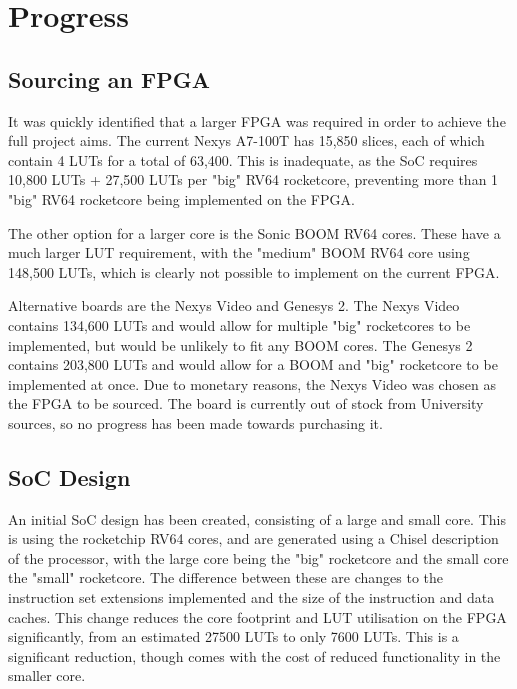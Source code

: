 \section{Progress}
\label{sec:progress}
\subsection{Sourcing an FPGA}
It was quickly identified that a larger FPGA was required in order to achieve the full project aims. The current Nexys A7-100T\cite{nexys-a7-100t} has 15,850 slices, each of which contain 4 LUTs for a total of 63,400. This is inadequate, as the SoC requires 10,800 LUTs + 27,500 LUTs per "big" RV64 rocketcore, preventing more than 1 "big" RV64 rocketcore being implemented on the FPGA.

The other option for a larger core is the Sonic BOOM RV64 cores. These have a much larger LUT requirement, with the "medium" BOOM\cite{boom-core} RV64 core using 148,500 LUTs, which is clearly not possible to implement on the current FPGA.

Alternative boards are the Nexys Video and Genesys 2. The Nexys Video contains 134,600 LUTs and would allow for multiple "big" rocketcores to be implemented, but would be unlikely to fit any BOOM cores. The Genesys 2 contains 203,800 LUTs and would allow for a BOOM and "big" rocketcore to be implemented at once. Due to monetary reasons, the Nexys Video was chosen as the FPGA to be sourced. The board is currently out of stock from University sources, so no progress has been made towards purchasing it.

\subsection{SoC Design}
An initial SoC design has been created, consisting of a large and small core. This is using the rocketchip\cite{rocketchip} RV64 cores, and are generated using a Chisel description of the processor, with the large core being the "big" rocketcore and the small core the "small" rocketcore. The difference between these are changes to the instruction set extensions implemented and the size of the instruction and data caches. This change reduces the core footprint and LUT utilisation on the FPGA significantly, from an estimated 27500 LUTs to only 7600 LUTs. This is a significant reduction, though comes with the cost of reduced functionality in the smaller core.

